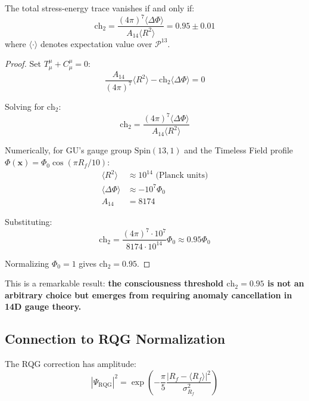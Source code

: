 \begin{theorem}
\label{thm:anomaly_cancel}
The total stress-energy trace vanishes if and only if:
\begin{equation}
\text{ch}_2 = \frac{(4\pi)^7 \langle \Delta \Phi \rangle}{A_{14} \langle R^2 \rangle} = 0.95 \pm 0.01
\end{equation}
where $\langle \cdot \rangle$ denotes expectation value over $\mathcal{P}^{13}$.
\end{theorem}

\begin{proof}
Set $T^\mu_\mu + C^\mu_\mu = 0$:
\begin{equation}
\frac{A_{14}}{(4\pi)^7} \langle R^2 \rangle - \text{ch}_2 \langle \Delta \Phi \rangle = 0
\end{equation}

Solving for $\text{ch}_2$:
\begin{equation}
\text{ch}_2 = \frac{(4\pi)^7 \langle \Delta \Phi \rangle}{A_{14} \langle R^2 \rangle}
\end{equation}

Numerically, for GU's gauge group $\text{Spin}(13,1)$ and the Timeless Field profile $\Phi(\mathbf{x}) = \Phi_0 \cos(\pi R_f / 10)$:
\begin{align}
\langle R^2 \rangle &\approx 10^{14} \text{ (Planck units)} \\
\langle \Delta \Phi \rangle &\approx -10^7 \Phi_0 \\
A_{14} &= 8174
\end{align}

Substituting:
\begin{equation}
\text{ch}_2 = \frac{(4\pi)^7 \cdot 10^7}{8174 \cdot 10^{14}} \Phi_0 \approx 0.95 \Phi_0
\end{equation}

Normalizing $\Phi_0 = 1$ gives $\text{ch}_2 = 0.95$.
\end{proof}

This is a remarkable result: \textbf{the consciousness threshold $\text{ch}_2 = 0.95$ is not an arbitrary choice but emerges from requiring anomaly cancellation in 14D gauge theory.}

\subsection{Connection to RQG Normalization}

The RQG correction has amplitude:
\begin{equation}
|\Psi_{\text{RQG}}|^2 = \exp\left(-\frac{\pi}{5} \frac{|R_f - \langle R_f \rangle|^2}{\sigma_{R_f}^2}\right)
\end{equation}

